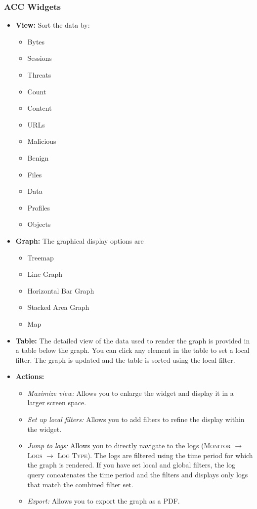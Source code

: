 \subsubsection{ACC Widgets}
\begin{itemize}
    \item \textbf{View:} Sort the data by:
        \begin{itemize}
            \item Bytes
            \item Sessions
            \item Threats
            \item Count
            \item Content
            \item URLs
            \item Malicious
            \item Benign
            \item Files
            \item Data
            \item Profiles
            \item Objects
        \end{itemize}
    \item \textbf{Graph:} The graphical display options are
        \begin{itemize}
            \item Treemap
            \item Line Graph
            \item Horizontal Bar Graph
            \item Stacked Area Graph
            \item Map
        \end{itemize}
    \item \textbf{Table:} The detailed view of the data used to render the graph is provided in a table below the graph.
    You can click any element in the table to set a local filter. The graph is updated and the table is sorted using the local filter.
    \item \textbf{Actions:}
        \begin{itemize}
            \item \textit{Maximize view:} Allows you to enlarge the widget and display it in a larger screen space.
            \item \textit{Set up local filters:} Allows you to add filters to refine the display within the widget.
            \item \textit{Jump to logs:} Allows you to directly navigate to the logs (\textsc{Monitor $\rightarrow$ Logs $\rightarrow$ Log Type}). The logs are filtered using the time period for which the graph is rendered.
            If you have set local and global filters, the log query concatenates the time period and the filters and displays only logs that match the combined filter set.
            \item \textit{Export:} Allows you to export the graph as a PDF.
        \end{itemize}
\end{itemize}

